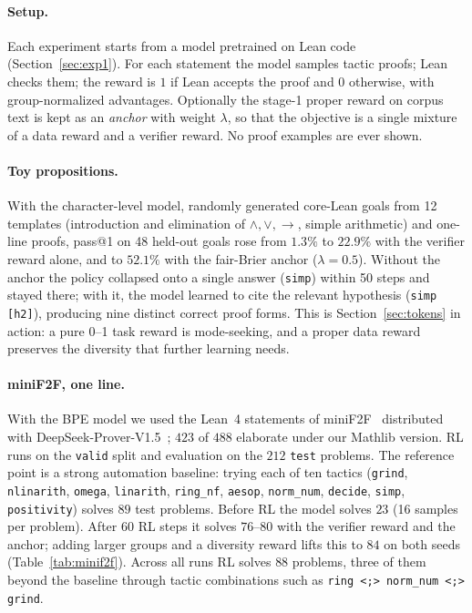 \documentclass[11pt]{article}
\theoremstyle{definition}
\begin{document}
\paragraph{Setup.} Each experiment starts from a model pretrained on Lean code (Section~\ref{sec:exp1}). For each statement the model samples tactic proofs; Lean checks them; the reward is $1$ if Lean accepts the proof and $0$ otherwise, with group-normalized advantages. Optionally the stage-1 proper reward on corpus text is kept as an \emph{anchor} with weight $\lambda$, so that the objective is a single mixture of a data reward and a verifier reward. No proof examples are ever shown.

\paragraph{Toy propositions.} With the character-level model, randomly generated core-Lean goals from 12 templates (introduction and elimination of $\wedge,\vee,\to$, simple arithmetic) and one-line proofs, pass@1 on 48 held-out goals rose from $1.3\%$ to $22.9\%$ with the verifier reward alone, and to $52.1\%$ with the fair-Brier anchor ($\lambda=0.5$). Without the anchor the policy collapsed onto a single answer (\texttt{simp}) within 50 steps and stayed there; with it, the model learned to cite the relevant hypothesis (\texttt{simp [h2]}), producing nine distinct correct proof forms. This is Section~\ref{sec:tokens} in action: a pure 0--1 task reward is mode-seeking, and a proper data reward preserves the diversity that further learning needs.

\paragraph{miniF2F, one line.} With the BPE model we used the Lean~4 statements of miniF2F~\cite{zheng2022minif2f} distributed with DeepSeek-Prover-V1.5~\cite{xin2024deepseekprover15}; $423$ of $488$ elaborate under our Mathlib version. RL runs on the \texttt{valid} split and evaluation on the $212$ \texttt{test} problems. The reference point is a strong automation baseline: trying each of ten tactics (\texttt{grind}, \texttt{nlinarith}, \texttt{omega}, \texttt{linarith}, \texttt{ring\_nf}, \texttt{aesop}, \texttt{norm\_num}, \texttt{decide}, \texttt{simp}, \texttt{positivity}) solves $89$ test problems. Before RL the model solves $23$ (16 samples per problem). After 60 RL steps it solves $76$--$80$ with the verifier reward and the anchor; adding larger groups and a diversity reward lifts this to $84$ on both seeds (Table~\ref{tab:minif2f}). Across all runs RL solves $88$ problems, three of them beyond the baseline through tactic combinations such as \texttt{ring <;> norm\_num <;> grind}.
\end{document}

